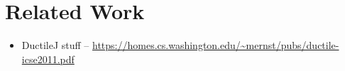 \newcommand{\relatedWorkSection}{Related Work}
\section{\protect\relatedWorkSection} %
\label{sec:relatedWork}

\begin{itemize}
	\item DuctileJ stuff -- \url{https://homes.cs.washington.edu/~mernst/pubs/ductile-icse2011.pdf}
\end{itemize}
